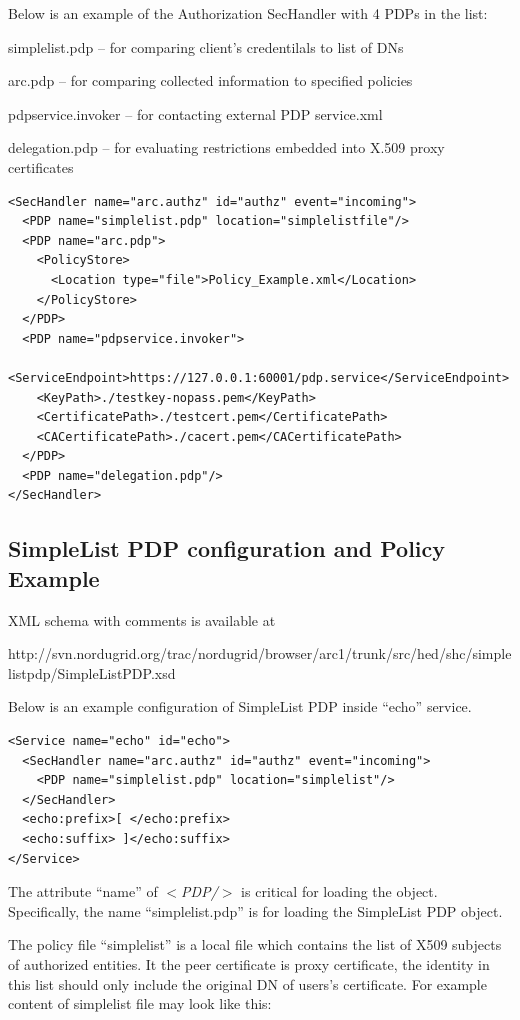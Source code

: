 \documentclass{article}                            %
\begin{document}
Below is an example of the Authorization SecHandler with 4 PDPs in the list:

simplelist.pdp – for comparing client's credentilals to list of DNs

arc.pdp – for comparing collected information to specified policies

pdpservice.invoker – for contacting external PDP service.xml

delegation.pdp – for evaluating restrictions embedded into X.509 proxy certificates

\begin{verbatim}
<SecHandler name="arc.authz" id="authz" event="incoming">
  <PDP name="simplelist.pdp" location="simplelistfile"/>
  <PDP name="arc.pdp">
    <PolicyStore>
      <Location type="file">Policy_Example.xml</Location>
    </PolicyStore>
  </PDP>
  <PDP name="pdpservice.invoker">
    <ServiceEndpoint>https://127.0.0.1:60001/pdp.service</ServiceEndpoint>
    <KeyPath>./testkey-nopass.pem</KeyPath>
    <CertificatePath>./testcert.pem</CertificatePath>
    <CACertificatePath>./cacert.pem</CACertificatePath>
  </PDP>
  <PDP name="delegation.pdp"/>
</SecHandler>
\end{verbatim}


\subsection{SimpleList PDP configuration and Policy Example} %
\label{subsec:simplepdp_conf}
XML schema with comments is available at 

http://svn.nordugrid.org/trac/nordugrid/browser/arc1/trunk/src/hed/shc/simplelistpdp/SimpleListPDP.xsd

Below is an example configuration of SimpleList PDP inside ``echo'' service.

\begin{verbatim}
<Service name="echo" id="echo">
  <SecHandler name="arc.authz" id="authz" event="incoming">
    <PDP name="simplelist.pdp" location="simplelist"/>
  </SecHandler>
  <echo:prefix>[ </echo:prefix>
  <echo:suffix> ]</echo:suffix>
</Service>
\end{verbatim}

The attribute ``name'' of \textit{$<$PDP/$>$} is critical for loading the object. Specifically, the name ``simplelist.pdp'' is for loading the SimpleList PDP object.

The policy file ``simplelist'' is a local file which contains the list of X509 subjects of authorized entities. It the peer certificate is proxy certificate, the identity in this list should only include the original DN of users's certificate.
For example content of simplelist file may look like this:
\end{document}
